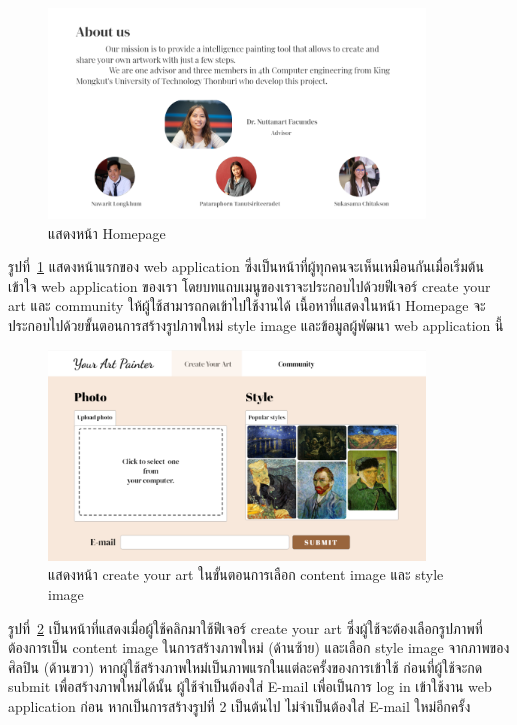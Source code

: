 \documentclass[12pt,oneside,openright,a4paper]{cpe-thai-project}
\begin{document}
\begin{figure}[!h]
  \centering
  \includegraphics[width=10cm]{./image/ui1-4.png}
  \caption{แสดงหน้า Homepage}
  \label{fig:ui-1}
\end{figure}

\newpage

\par\setlength{\parindent}{5ex}
รูปที่~\ref{fig:ui-1} แสดงหน้าแรกของ web application ซึ่งเป็นหน้าที่ผู้ทุกคนจะเห็นเหมือนกันเมื่อเริ่มต้นเข้าใจ web application ของเรา โดยบทแถบเมนูของเราจะประกอบไปด้วยฟีเจอร์ create your art และ community ให้ผู้ใช้สามารถกดเข้าไปใช้งานได้ เนื้อหาที่แสดงในหน้า Homepage จะประกอบไปด้วยขั้นตอนการสร้างรูปภาพใหม่ style image และข้อมูลผู้พัฒนา web application นี้

\begin{figure}[!h]
  \centering
  \includegraphics[width=10cm]{./image/ui-create.png}
  \caption{แสดงหน้า create your art ในขั้นตอนการเลือก content image และ style image}
  \label{fig:ui-create}
\end{figure}
\par\setlength{\parindent}{5ex}
รูปที่~\ref{fig:ui-create} เป็นหน้าที่แสดงเมื่อผู้ใช้คลิกมาใช้ฟีเจอร์ create your art ซึ่งผู้ใช้จะต้องเลือกรูปภาพที่ต้องการเป็น content image ในการสร้างภาพใหม่ (ด้านซ้าย) และเลือก style image จากภาพของศิลปิน (ด้านขวา) หากผู้ใช้สร้างภาพใหม่เป็นภาพแรกในแต่ละครั้งของการเข้าใช้ ก่อนที่ผู้ใช้จะกด submit เพื่อสร้างภาพใหม่ได้นั้น ผู้ใช้จำเป็นต้องใส่ E-mail เพื่อเป็นการ log in เข้าใช้งาน web application ก่อน หากเป็นการสร้างรูปที่ 2 เป็นต้นไป ไม่จำเป็นต้องใส่ E-mail ใหม่อีกครั้ง
\end{document}

